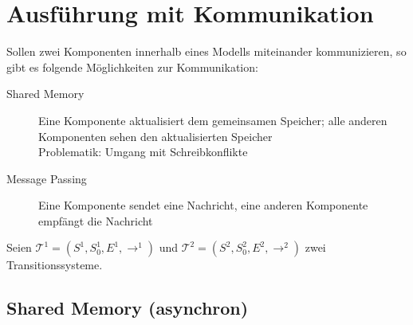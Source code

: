 	\section{Ausführung mit Kommunikation}
		Sollen zwei Komponenten innerhalb eines Modells miteinander kommunizieren, so gibt es folgende Möglichkeiten zur Kommunikation:
		\begin{description}
			\item[Shared Memory] Eine Komponente aktualisiert dem gemeinsamen Speicher; alle anderen Komponenten sehen den aktualisierten Speicher \\
				Problematik: Umgang mit Schreibkonflikte
			\item[Message Passing] Eine Komponente sendet eine Nachricht, eine anderen Komponente empfängt die Nachricht
		\end{description}

		Seien $ \mathcal{T} ^ 1 = (S ^ 1, S _ 0 ^ 1, E ^ 1, \rightarrow ^ 1) $ und $ \mathcal{T} ^ 2 = (S ^ 2, S _ 0 ^ 2, E ^ 2, \rightarrow ^ 2) $ zwei Transitionssysteme.

		\subsection{Shared Memory (asynchron)}

